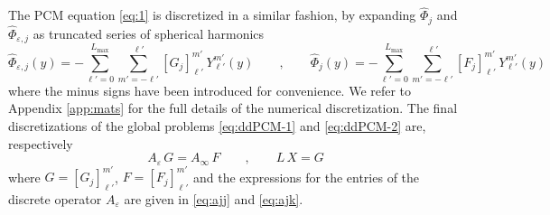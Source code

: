 The PCM equation \eqref{eq:1} is discretized in a similar fashion, by expanding $\hat{\Phi}_j$ and $\hat{\Phi}_{\varepsilon,j}$ as truncated series of spherical harmonics
\[
\hat{\Phi}_{\varepsilon,j}(y) = - \sum_{\ell'=0}^{L_\text{max}} \sum_{m' = -\ell'}^{\ell'} [G_j]_{\ell'}^{m'} \, Y_{\ell'}^{m'}(y) \qquad , \qquad \hat{\Phi}_j(y) = -\sum_{\ell'=0}^{L_\text{max}} \sum_{m' = -\ell'}^{\ell'} [F_j]_{\ell'}^{m'} \, Y_{\ell'}^{m'}(y)
\]
where the minus signs have been introduced for convenience. We refer to Appendix \ref{app:mats} for the full details of the numerical discretization.
The final discretizations of the global problems \eqref{eq:ddPCM-1} and \eqref{eq:ddPCM-2} are, respectively
\begin{equation}\label{eq:6}
A_\varepsilon \, G = A_\infty \, F \qquad , \qquad  L \, X = G
\end{equation}
where $G = [G_j]_{\ell'}^{m'}$,  $F = [F_j]_{\ell'}^{m'}$ and the expressions for the entries of the discrete operator $A_\varepsilon$ are given in \eqref{eq:ajj} and \eqref{eq:ajk}.
